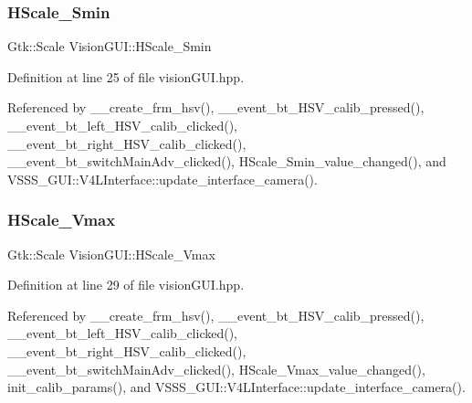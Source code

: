 \mbox{\label{class_vision_g_u_i_a23eb7af1cc6d3a055892de4704b48126}} 
\subsubsection{\texorpdfstring{H\+Scale\+\_\+\+Smin}{HScale\_Smin}}
{\footnotesize\ttfamily Gtk\+::\+Scale Vision\+G\+U\+I\+::\+H\+Scale\+\_\+\+Smin}



Definition at line 25 of file vision\+G\+U\+I.\+hpp.



Referenced by \+\_\+\+\_\+create\+\_\+frm\+\_\+hsv(), \+\_\+\+\_\+event\+\_\+bt\+\_\+\+H\+S\+V\+\_\+calib\+\_\+pressed(), \+\_\+\+\_\+event\+\_\+bt\+\_\+left\+\_\+\+H\+S\+V\+\_\+calib\+\_\+clicked(), \+\_\+\+\_\+event\+\_\+bt\+\_\+right\+\_\+\+H\+S\+V\+\_\+calib\+\_\+clicked(), \+\_\+\+\_\+event\+\_\+bt\+\_\+switch\+Main\+Adv\+\_\+clicked(), H\+Scale\+\_\+\+Smin\+\_\+value\+\_\+changed(), and V\+S\+S\+S\+\_\+\+G\+U\+I\+::\+V4\+L\+Interface\+::update\+\_\+interface\+\_\+camera().

\mbox{\label{class_vision_g_u_i_ab277d08dcce9e2521b9d4c542be69247}} 
\subsubsection{\texorpdfstring{H\+Scale\+\_\+\+Vmax}{HScale\_Vmax}}
{\footnotesize\ttfamily Gtk\+::\+Scale Vision\+G\+U\+I\+::\+H\+Scale\+\_\+\+Vmax}



Definition at line 29 of file vision\+G\+U\+I.\+hpp.



Referenced by \+\_\+\+\_\+create\+\_\+frm\+\_\+hsv(), \+\_\+\+\_\+event\+\_\+bt\+\_\+\+H\+S\+V\+\_\+calib\+\_\+pressed(), \+\_\+\+\_\+event\+\_\+bt\+\_\+left\+\_\+\+H\+S\+V\+\_\+calib\+\_\+clicked(), \+\_\+\+\_\+event\+\_\+bt\+\_\+right\+\_\+\+H\+S\+V\+\_\+calib\+\_\+clicked(), \+\_\+\+\_\+event\+\_\+bt\+\_\+switch\+Main\+Adv\+\_\+clicked(), H\+Scale\+\_\+\+Vmax\+\_\+value\+\_\+changed(), init\+\_\+calib\+\_\+params(), and V\+S\+S\+S\+\_\+\+G\+U\+I\+::\+V4\+L\+Interface\+::update\+\_\+interface\+\_\+camera().


